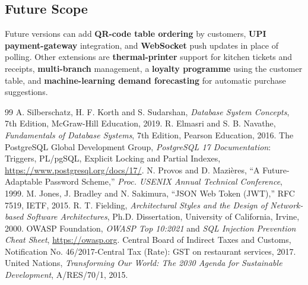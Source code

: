 \documentclass[11pt,a4paper]{report}
\begin{document}
\subsection{Future Scope}
Future versions can add \textbf{QR-code table ordering} by customers, \textbf{UPI payment-gateway} integration, and \textbf{WebSocket} push updates in place of polling. Other extensions are \textbf{thermal-printer} support for kitchen tickets and receipts, \textbf{multi-branch} management, a \textbf{loyalty programme} using the customer table, and \textbf{machine-learning demand forecasting} for automatic purchase suggestions.


\begin{thebibliography}{99}
     A. Silberschatz, H. F. Korth and S. Sudarshan, \textit{Database System Concepts}, 7th Edition, McGraw-Hill Education, 2019.
     R. Elmasri and S. B. Navathe, \textit{Fundamentals of Database Systems}, 7th Edition, Pearson Education, 2016.
     The PostgreSQL Global Development Group, \textit{PostgreSQL 17 Documentation}: Triggers, PL/pgSQL, Explicit Locking and Partial Indexes, \url{https://www.postgresql.org/docs/17/}.
     N. Provos and D. Mazi\`{e}res, ``A Future-Adaptable Password Scheme,'' \textit{Proc. USENIX Annual Technical Conference}, 1999.
     M. Jones, J. Bradley and N. Sakimura, ``JSON Web Token (JWT),'' RFC 7519, IETF, 2015.
     R. T. Fielding, \textit{Architectural Styles and the Design of Network-based Software Architectures}, Ph.D. Dissertation, University of California, Irvine, 2000.
     OWASP Foundation, \textit{OWASP Top 10:2021} and \textit{SQL Injection Prevention Cheat Sheet}, \url{https://owasp.org}.
     Central Board of Indirect Taxes and Customs, Notification No. 46/2017-Central Tax (Rate): GST on restaurant services, 2017.
     United Nations, \textit{Transforming Our World: The 2030 Agenda for Sustainable Development}, A/RES/70/1, 2015.
\end{thebibliography}
\end{document}
